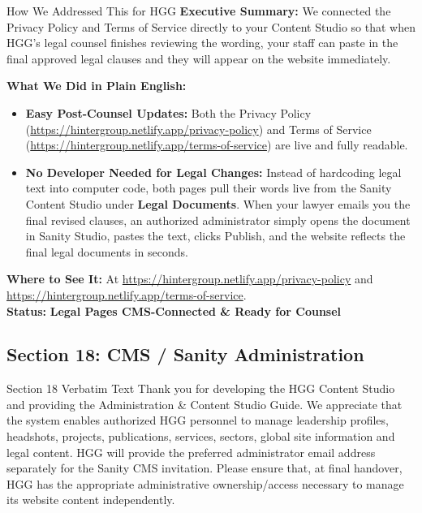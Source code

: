 \documentclass[11pt,a4paper]{article}
\begin{document}
\begin{DetailedResolutionBox}{How We Addressed This for HGG}
\textbf{Executive Summary:} We connected the Privacy Policy and Terms of Service directly to your Content Studio so that when HGG's legal counsel finishes reviewing the wording, your staff can paste in the final approved legal clauses and they will appear on the website immediately.

\textbf{What We Did in Plain English:}
\begin{itemize}
    \item \textbf{Easy Post-Counsel Updates:} Both the Privacy Policy (\url{https://hintergroup.netlify.app/privacy-policy}) and Terms of Service (\url{https://hintergroup.netlify.app/terms-of-service}) are live and fully readable.
    \item \textbf{No Developer Needed for Legal Changes:} Instead of hardcoding legal text into computer code, both pages pull their words live from the Sanity Content Studio under \textbf{Legal Documents}. When your lawyer emails you the final revised clauses, an authorized administrator simply opens the document in Sanity Studio, pastes the text, clicks Publish, and the website reflects the final legal documents in seconds.
\end{itemize}

\textbf{Where to See It:} At \url{https://hintergroup.netlify.app/privacy-policy} and \url{https://hintergroup.netlify.app/terms-of-service}. \\
\textbf{Status:} \textcolor{HGGGreen}{\textbf{Legal Pages CMS-Connected \& Ready for Counsel}}
\end{DetailedResolutionBox}

\vspace{0.3cm}

\subsection{Section 18: CMS / Sanity Administration}

\begin{VerbatimClientBox}{Section 18 Verbatim Text}
Thank you for developing the HGG Content Studio and providing the Administration \& Content Studio Guide.
We appreciate that the system enables authorized HGG personnel to manage leadership profiles, headshots, projects, publications, services, sectors, global site information and legal content.
HGG will provide the preferred administrator email address separately for the Sanity CMS invitation.
Please ensure that, at final handover, HGG has the appropriate administrative ownership/access necessary to manage its website content independently.
\end{VerbatimClientBox}
\end{document}
